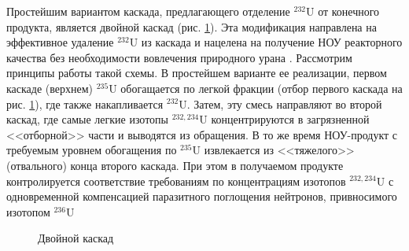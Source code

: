 Простейшим вариантом каскада, предлагающего отделение $^{232}$U от конечного продукта, является двойной каскад (рис. \ref{fig:double_ru}).
Эта модификация направлена на эффективное удаление $^{232}$U из каскада и нацелена на получение НОУ реакторного качества без необходимости вовлечения природного урана \cite{SosninYuChelcov, TehnicheskieResheniyaPo}.
Рассмотрим принципы работы такой схемы.
В простейшем варианте ее реализации, первом каскаде (верхнем) $^{235}$U обогащается по легкой фракции (отбор первого каскада на рис. \ref{fig:double_ru}), где также накапливается $^{232}$U.
Затем, эту смесь направляют во второй каскад, где самые легкие изотопы $^{232,234}$U концентрируются в загрязненной <<отборной>> части и выводятся из обращения.
В то же время НОУ-продукт с требуемым уровнем обогащения по $^{235}$U извлекается из <<тяжелого>> (отвального) конца второго каскада. При этом в получаемом продукте контролируется соответствие требованиям по концентрациям изотопов $^{232,234}$U с одновременной компенсацией паразитного поглощения нейтронов, привносимого изотопом $^{236}$U
\begin{figure}[ht]
  \caption{Двойной каскад}\label{fig:double_ru}
\end{figure}


